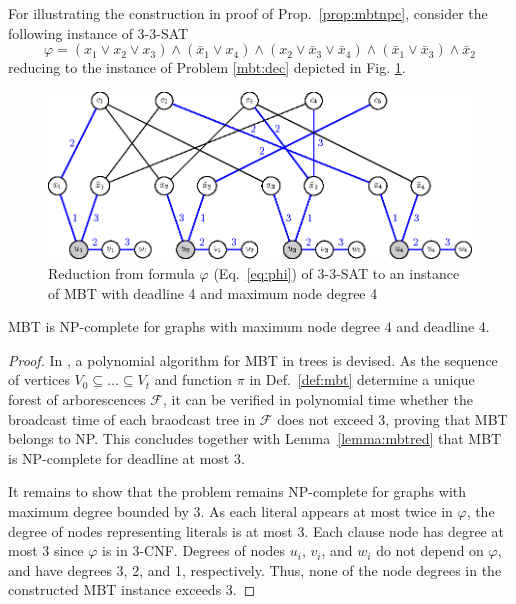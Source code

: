 For illustrating the construction in proof of Prop.~\ref{prop:mbtnpc}, consider the following instance of \textsc{3-3-SAT}
\begin{equation}
\varphi=(x_1\vee x_2\vee x_3)\wedge(\bar{x}_1\vee x_4)\wedge(x_2\vee \bar{x}_3 \vee\bar{x}_4)\wedge(\bar{x}_1\vee \bar{x}_3)\wedge \bar{x}_2 
\label{eq:phi}
\end{equation}
reducing to the instance of Problem \ref{mbt:dec} depicted in Fig. \ref{fig:mbtnpc}.
\begin{figure}
\centering
\includegraphics{figurer/mbtnpc.eps}
\caption{Reduction from formula $\varphi$ (Eq.~\eqref{eq:phi}) of \textsc{3-3-SAT} to an instance of MBT with deadline 4 and maximum node degree 4}
\label{fig:mbtnpc}
\end{figure}

\begin{proposition}
MBT is NP-complete for graphs with maximum node degree 4 and deadline 4.
\end{proposition}
\begin{proof}
In \cite{slater81}, a polynomial algorithm for MBT in trees is devised.
As the sequence of vertices $V_0\subseteq\dots\subseteq V_t$ and function $\pi$ in Def.~\ref{def:mbt} determine a unique forest of arborescences $\mathcal{F}$,
it can be verified in polynomial time whether the broadcast time of each braodcast tree in $\mathcal{F}$ does not exceed 3, proving that MBT belongs to NP.
This concludes together with Lemma~\ref{lemma:mbtred} that MBT is NP-complete for deadline at most 3.

It remains to show that the problem remains NP-complete for graphs with maximum degree bounded by 3.
As each literal appears at most twice in $\varphi$, the degree of nodes representing literals is at most 3. 
Each clause node has degree at most 3 since $\varphi$ is in 3-CNF.
Degrees of nodes $u_i$, $v_i$, and $w_i$ do not depend on $\varphi$, and have degrees 3, 2, and 1, respectively.
Thus, none of the node degrees in the constructed MBT instance exceeds 3.
\end{proof}

